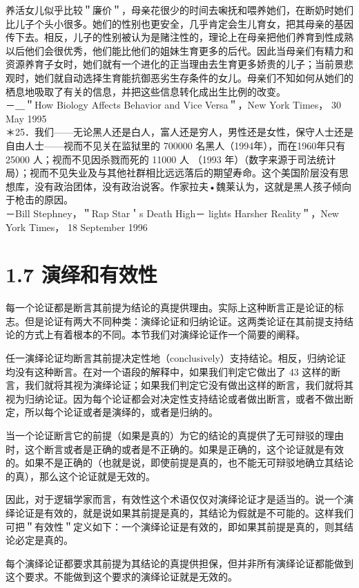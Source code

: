 养活女儿似乎比较＂廉价＂，母亲花很少的时间去啝抚和喂养她们，在断奶时她们比儿子个头小很多。她们的性别也更安全，几乎肯定会生儿育女，把其母亲的基因传下去。相反，儿子的性别被认为是赌注性的，理论上在母亲把他们养育到性成熟以后他们会很优秀，他们能比他们的姐妹生育更多的后代。因此当母亲们有精力和资源养育子女时，她们就有一个进化的正当理由去生育更多娇贵的儿子；当前景悲观时，她们就自动选择生育能抗御恶劣生存条件的女儿。母亲们不知如何从她们的栖息地吸取了有关的信息，并把这些信息转化成出生比例的改变。\\
－＿＂How Biology Affects Behavior and Vice Versa＂，New York Times， 30 May 1995\\
＊25．我们——无论黑人还是白人，富人还是穷人，男性还是女性，保守人士还是自由人士——视而不见关在监狱里的 700000 名黑人（1994年），而在1960年只有 25000 人；视而不见因杀戮而死的 11000 人 （1993 年）（数字来源于司法统计局）；视而不见失业及与其他社群相比远远落后的期望寿命。这个美国阶层没有思想库，没有政治团体，没有政治说客。作家拉夫•魏莱认为，这就是黑人孩子倾向于枪击的原因。\\
－Bill Stephney，＂Rap Star＇s Death High－ lights Harsher Reality＂，New York Times， 18 September 1996

\section*{1.7 演绎和有效性}
每一个论证都是断言其前提为结论的真提供理由。实际上这种断言正是论证的标志。但是论证有两大不同种类：演绎论证和归纳论证。这两类论证在其前提支持结论的方式上有着根本的不同。本节我们对演绎论证作一个简要的阐释。

任一演绎论证均断言其前提决定性地（conclusively）支持结论。相反，归纳论证均没有这种断言。在对一个语段的解释中，如果我们判定它做出了 43 这样的断言，我们就将其视为演绎论证；如果我们判定它没有做出这样的断言，我们就将其视为归纳论证。因为每个论证都会对决定性支持结论或者做出断言，或者不做出断定，所以每个论证或者是演绎的，或者是归纳的。

当一个论证断言它的前提（如果是真的）为它的结论的真提供了无可辩驳的理由时，这个断言或者是正确的或者是不正确的。如果是正确的，这个论证就是有效的。如果不是正确的（也就是说，即使前提是真的，也不能无可辩驳地确立其结论的真），那么这个论证就是无效的。

因此，对于逻辑学家而言，有效性这个术语仅仅对演绎论证才是适当的。说一个演绎论证是有效的，就是说如果其前提是真的，其结论为假就是不可能的。这样我们可把＂有效性＂定义如下：一个演绎论证是有效的，即如果其前提是真的，则其结论必定是真的。

每个演绎论证都要求其前提为其结论的真提供担保，但并非所有演绎论证都能做到这个要求。不能做到这个要求的演绎论证就是无效的。

